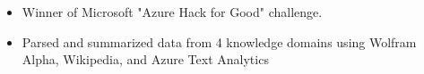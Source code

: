 \begin{itemize}
    \item Winner of Microsoft "Azure Hack for Good" challenge.
    \item Parsed and summarized data from 4 knowledge domains using Wolfram Alpha, Wikipedia, and Azure Text Analytics
\end{itemize}